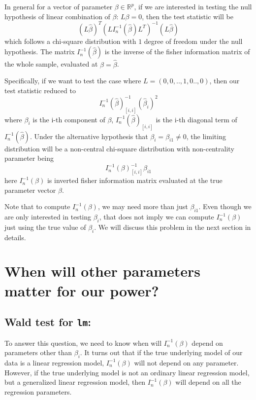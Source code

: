 \documentclass[
]{article}
\begin{document}
In general for a vector of parameter \(\beta \in \mathbb{R}^p\), if we
are interested in testing the null hypothesis of linear combination of
\(\beta\): \(L\beta = 0\), then the test statistic will be
\[(L\hat{\beta})^T (L{I_n^{-1}(\hat{\beta})L^T})^{-1}(L\hat{\beta})\]
which follows a chi-square distribution with \(1\) degree of freedom
under the null hypothesis. The matrix \(I_n^{-1}(\hat{\beta})\) is the
inverse of the fisher information matrix of the whole sample, evaluated
at \(\beta = \hat{\beta}\).

Specifically, if we want to test the case where \(L =(0,0,..,1,0..,0)\),
then our test statistic reduced to
\[I_n^{-1}(\hat{\beta})_{[i,i]}^{-1}(\hat{\beta}_i)^2\] where
\(\beta_i\) is the i-th component of \(\beta\),
\(I_n^{-1}(\hat{{\beta}})_{[i,i]}\) is the i-th diagonal term of
\(I_n^{-1}(\hat{{\beta}})\). Under the alternative hypothesis that
\(\beta_i=\beta_{i1}\neq0\), the limiting distribution will be a
non-central chi-square distribution with non-centrality parameter being
\[I_n^{-1}(\beta)_{[i,i]}^{-1}\beta_{i1}\] here \(I_n^{-1}(\beta)\) is
inverted fisher information matrix evaluated at the true parameter
vector \(\beta\).

Note that to compute \(I_n^{-1}(\beta)\), we may need more than just
\(\beta_{i1}\). Even though we are only interested in testing
\(\beta_i\), that does not imply we can compute \(I_n^{-1}(\beta)\) just
using the true value of \(\beta_i\). We will discuss this problem in the
next section in details.

\hypertarget{when-will-other-parameters-matter-for-our-power}{%
\section{When will other parameters matter for our
power?}\label{when-will-other-parameters-matter-for-our-power}}

\hypertarget{wald-test-for-lm}{%
\subsection{\texorpdfstring{Wald test for
\texttt{lm}:}{Wald test for lm:}}\label{wald-test-for-lm}}

To answer this question, we need to know when will \(I_n^{-1}(\beta)\)
depend on parameters other than \(\beta_i\). It turns out that if the
true underlying model of our data is a linear regression model,
\(I_n^{-1}(\beta)\) will not depend on any parameter. However, if the
true underlying model is not an ordinary linear regression model, but a
generalized linear regression model, then \(I_n^{-1}(\beta)\) will
depend on all the regression parameters.
\end{document}
